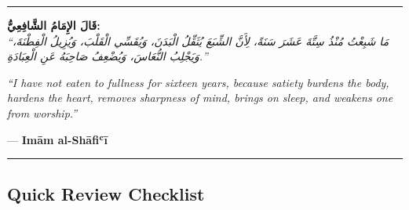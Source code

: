 \documentclass[
  a4paper,
  DIV=11,
  numbers=noendperiod]{scrartcl}
\begin{document}
\begin{center}\rule{0.5\linewidth}{0.5pt}\end{center}

\begin{tcolorbox}[enhanced jigsaw, bottomrule=.15mm, arc=.35mm, colbacktitle=quarto-callout-tip-color!10!white, opacityback=0, toptitle=1mm, title=\textcolor{quarto-callout-tip-color}{\faLightbulb}\hspace{0.5em}{A Scholar's Reflection}, colframe=quarto-callout-tip-color-frame, opacitybacktitle=0.6, colback=white, coltitle=black, titlerule=0mm, left=2mm, toprule=.15mm, bottomtitle=1mm, rightrule=.15mm, leftrule=.75mm, breakable]

\textbf{قَالَ الإِمَامُ الشَّافِعِيُّ:}\\
\emph{``مَا شَبِعْتُ مُنْذُ سِتَّةَ عَشَرَ سَنَةً، لِأَنَّ الشِّبَعَ يُثَقِّلُ الْبَدَنَ، وَيُقَسِّي الْقَلْبَ،
وَيُزِيلُ الْفِطْنَةَ، وَيَجْلِبُ النُّعَاسَ، وَيُضْعِفُ صَاحِبَهُ عَنِ الْعِبَادَةِ.''}

\emph{``I have not eaten to fullness for sixteen years, because satiety
burdens the body, hardens the heart, removes sharpness of mind, brings
on sleep, and weakens one from worship.''}

--- \textbf{Imām al-Shāfiʿī}

\end{tcolorbox}

\begin{center}\rule{0.5\linewidth}{0.5pt}\end{center}

\subsection{Quick Review Checklist}\label{quick-review-checklist}
\end{document}
